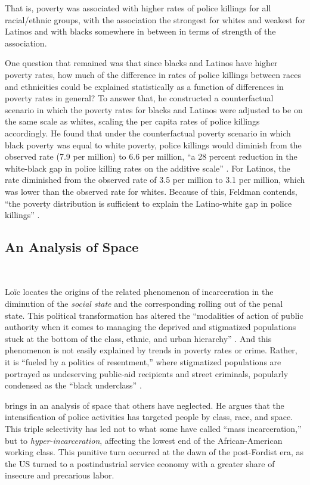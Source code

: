 \documentclass[12pt]{article}
\begin{document}
\noindent{}That is, poverty was associated with higher rates of police killings for all racial/ethnic groups, with the association the strongest for whites and weakest for Latinos and with blacks somewhere in between in terms of strength of the association.

One question that remained was that since blacks and Latinos have higher poverty rates, how much of the difference in rates of police killings between races and ethnicities could be explained statistically as a function of differences in poverty rates in general? To answer that, he constructed a counterfactual scenario in which the poverty rates for blacks and Latinos were adjusted to be on the same scale as whites, scaling the per capita rates of police killings accordingly. He found that under the counterfactual poverty scenario in which black poverty was equal to white poverty, police killings would diminish from the observed rate (7.9 per million) to 6.6 per million, “a 28 percent reduction in the white-black gap in police killing rates on the additive scale” \parencite{feldmanPoliceKillingsUS2020}. For Latinos, the rate diminished from the observed rate of 3.5 per million to 3.1 per million, which was lower than the observed rate for whites. Because of this, Feldman contends, “the poverty distribution is sufficient to explain the Latino-white gap in police killings” \parencite{feldmanPoliceKillingsUS2020}.

\subsection{An Analysis of Space}\

Lo\"ic \textcite{wacquantClassRaceHyperincarceration2010} locates the origins of the related phenomenon of incarceration in the diminution of the \textit{social state} and the corresponding rolling out of the penal state. This political transformation has altered the “modalities of action of public authority when it comes to managing the deprived and stigmatized populations stuck at the bottom of the class, ethnic, and urban hierarchy” \parencite[74]{wacquantClassRaceHyperincarceration2010}. And this phenomenon is not easily explained by trends in poverty rates or crime. Rather, it is “fueled by a politics of resentment,” where stigmatized populations are portrayed as undeserving public-aid recipients and street criminals, popularly condensed as the “black underclass” \parencite[74]{wacquantClassRaceHyperincarceration2010}.

\textcite{wacquantClassRaceHyperincarceration2010} brings in an analysis of space that others have neglected. He argues that the intensification of police activities has targeted people by class, race, and space. This triple selectivity has led not to what some have called “mass incarceration,” but to \emph{hyper-incarceration}, affecting the lowest end of the African-American working class. This punitive turn occurred at the dawn of the post-Fordist era, as the US turned to a postindustrial service economy with a greater share of insecure and precarious labor.
\end{document}
